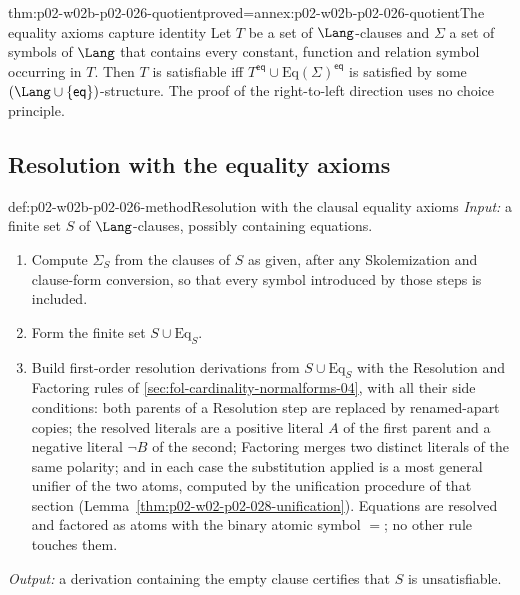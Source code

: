 \begin{hblemma}{thm:p02-w02b-p02-026-quotient}{proved=annex:p02-w02b-p02-026-quotient}{The equality axioms capture identity}
Let \(T\) be a set of \(\Lang\)-clauses and \(\Sigma\) a set of symbols of
\(\Lang\) that contains every constant, function and relation symbol
occurring in \(T\).  Then \(T\) is satisfiable iff
\(T^{\mathsf{eq}}\cup\mathrm{Eq}(\Sigma)^{\mathsf{eq}}\) is satisfied by some
\((\Lang\cup\{\mathsf{eq}\})\)-structure.  The proof of the right-to-left
direction uses no choice principle.
\end{hblemma}

\subsection{Resolution with the equality axioms}
\label{sec:p02-w02b-p02-026-method}

\begin{hbmethod}{def:p02-w02b-p02-026-method}{Resolution with the clausal equality axioms}
\emph{Input:} a finite set \(S\) of \(\Lang\)-clauses, possibly containing
equations.
\begin{enumerate}
  \item Compute \(\Sigma_S\) from the clauses of \(S\) as given, after any
        Skolemization and clause-form conversion, so that every symbol
        introduced by those steps is included.
  \item Form the finite set \(S\cup\mathrm{Eq}_S\).
  \item Build first-order resolution derivations from \(S\cup\mathrm{Eq}_S\)
        with the Resolution and Factoring rules of
        \cref{sec:fol-cardinality-normalforms-04}, with all their side
        conditions: both parents of a Resolution step are replaced by
        renamed-apart copies; the resolved literals are a positive literal
        \(A\) of the first parent and a negative literal \(\neg B\) of the
        second; Factoring merges two distinct literals of the same polarity;
        and in each case the substitution applied is a most general unifier of
        the two atoms, computed by the unification procedure of that section
        (Lemma~\ref{thm:p02-w02-p02-028-unification}).  Equations are
        resolved and factored as atoms with the binary atomic symbol \(=\);
        no other rule touches them.
\end{enumerate}
\emph{Output:} a derivation containing the empty clause certifies that \(S\)
is unsatisfiable.
\end{hbmethod}

